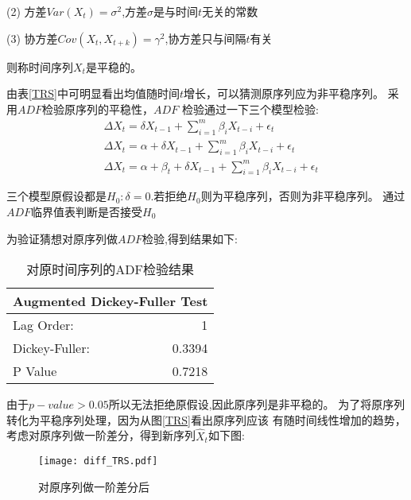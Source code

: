 \documentclass[12pt,a4paper]{nmmcm}
\begin{document}
  (2) 方差\(Var(X_t) = \sigma^2\),方差\(\sigma\)是与时间\(t\)无关的常数

  (3) 协方差\(Cov(X_t,X_{t+k}) = \gamma^2\),协方差只与间隔\(t\)有关  

  则称时间序列\(X_t\)是平稳的。

由表\ref{TRS}中可明显看出均值随时间\(t\)增长，可以猜测原序列应为非平稳序列。
采用\(ADF\)检验原序列的平稳性，\(ADF\) 检验通过一下三个模型检验:
\begin{equation}
  \begin{aligned}
  &\Delta X_t = \delta X_{t-1} + \sum_{i=1}^{m}\beta_i X_{t-i} + \epsilon_t \\
  &\Delta X_t =\alpha + \delta X_{t-1} + \sum_{i=1}^{m}\beta_i X_{t-i} + \epsilon_t \\
  &\Delta X_t =\alpha +\beta_t+ \delta X_{t-1} + \sum_{i=1}^{m}\beta_i X_{t-i} + \epsilon_t
  \end{aligned}
\end{equation}

三个模型原假设都是\(H_0 : \delta = 0\).若拒绝\(H_0\)则为平稳序列，否则为非平稳序列。
通过\(ADF \)临界值表判断是否接受\(H_0\)\nocite{Ruey}

为验证猜想对原序列做\(ADF\)检验,得到结果如下:
\begin{table}[htb]
  \centering
  \caption{对原时间序列的ADF检验结果}
    \begin{tabular}{lr}
    \multicolumn{2}{c}{ Augmented Dickey-Fuller Test} \\
    \hline
    Lag Order: & 1 \\
    Dickey-Fuller: & 0.3394\\
    P Value  & 0.7218 \\
    \end{tabular}%
  \label{tab:ADF_raw}%
\end{table}%

由于\(p-value > 0.05 \)所以无法拒绝原假设,因此原序列是非平稳的。
为了将原序列转化为平稳序列处理，因为从图\ref{TRS}看出原序列应该
有随时间线性增加的趋势，考虑对原序列做一阶差分\cite{Rob}，得到新序列\(\hat{X}_t\)如下图:
\begin{figure}[H] %
  \centering %
  \texttt{[image: diff\_TRS.pdf]} %
  \caption{对原序列做一阶差分后} %
  \label{diff_TRS} %
\end{figure} 
\end{document}
